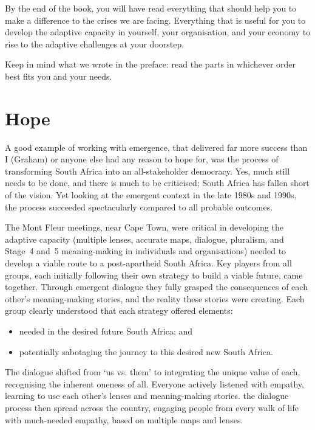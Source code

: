 By the end of the book, you will have read everything that should help you to make a difference to the crises we are facing. Everything that is useful for you to develop the adaptive capacity in yourself, your organisation, and your economy to rise to the adaptive challenges at your doorstep. 


Keep in mind what we wrote in the preface: read the parts in whichever order best fits you and your needs.


\section{Hope}
\label{section:hope}


A good example of working with emergence, that delivered far more success than I (Graham) or anyone else had any reason to hope for, was the process of transforming South Africa into an all-stakeholder democracy. Yes, much still needs to be done, and there is much to be criticised; South Africa has fallen short of the vision. Yet looking at the emergent context in the late 1980s and 1990s, the process succeeded spectacularly compared to all probable outcomes. 


The Mont Fleur meetings\cite{kahane-solving}, near Cape Town, were critical in developing the adaptive capacity (multiple lenses, accurate maps, dialogue, pluralism, and Stage~4 and~5 meaning\hyp{}making in individuals and organisations) needed to develop a viable route to a post-apartheid South Africa. Key players from all groups, each initially following their own strategy to build a viable future, came together. Through emergent dialogue they fully grasped the consequences of each other’s meaning\hyp{}making stories, and the reality these stories were creating. Each group clearly understood that each strategy offered elements:


\begin{itemize}
\item needed in the desired future South Africa; and
\item potentially sabotaging the journey to this desired new South Africa.
\end{itemize}


The dialogue shifted from ‘us vs. them’ to integrating the unique value of each, recognising the inherent oneness of all. Everyone actively listened with empathy, learning to use each other's lenses and meaning\hyp{}making stories. the dialogue process then spread across the country, engaging people from every walk of life with much-needed empathy, based on multiple maps and lenses. 


